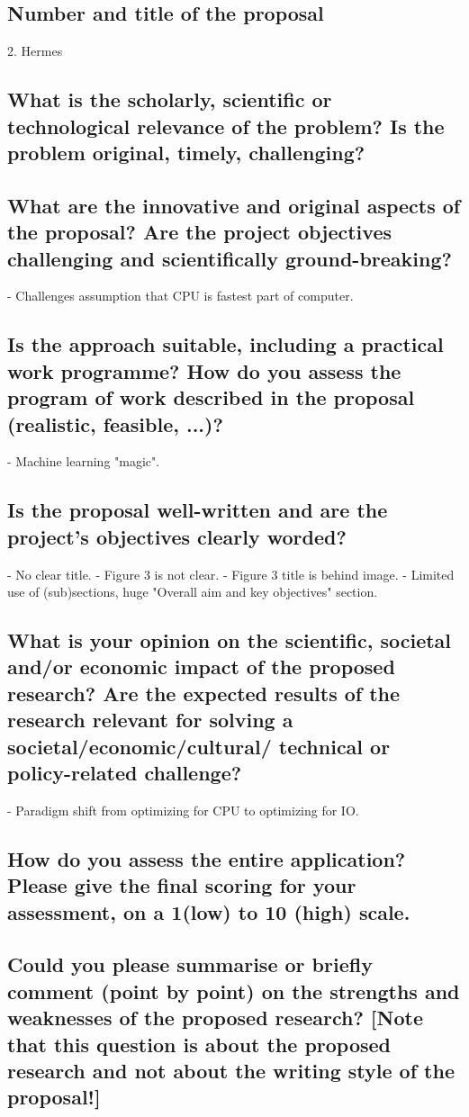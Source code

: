 \subsection*{Number and title of the proposal}
2. Hermes

\subsection*{What is the scholarly, scientific or technological relevance of the problem? Is the problem original, timely, challenging?}

\subsection*{What are the innovative and original aspects of the proposal? Are the project objectives challenging and scientifically ground-breaking?}
- Challenges assumption that CPU is fastest part of computer.

\subsection*{Is the approach suitable, including a practical work programme? How do you assess the program of work described in the proposal (realistic, feasible, ...)?}
- Machine learning "magic".

\subsection*{Is the proposal well-written and are the project’s objectives clearly worded?}
- No clear title.
- Figure 3 is not clear.
- Figure 3 title is behind image.
- Limited use of (sub)sections, huge "Overall aim and key objectives" section.

\subsection*{What is your opinion on the scientific, societal and/or economic impact of the proposed research? Are the expected results of the research relevant for solving a societal/economic/cultural/ technical or policy-related challenge?}
- Paradigm shift from optimizing for CPU to optimizing for IO.

\subsection*{How do you assess the entire application? Please give the final scoring for your assessment, on a 1(low) to 10 (high) scale.}

\subsection*{Could you please summarise or briefly comment (point by point) on the strengths and weaknesses of the proposed research? [Note that this question is about the proposed research and not about the writing style of the proposal!]}
